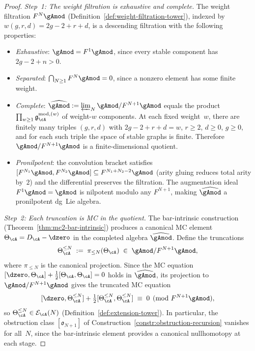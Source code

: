 \begin{proof}
\emph{Step~1: The weight filtration is exhaustive and complete.}
The weight filtration $F^N\gAmod$
(Definition~\ref{def:weight-filtration-tower}), indexed by
$w(g,r,d) = 2g-2+r+d$, is a descending filtration with the
following properties:
\begin{itemize}
\item \emph{Exhaustive}: $\gAmod = F^1\gAmod$, since every
  stable component has $2g - 2 + n > 0$.
\item \emph{Separated}: $\bigcap_{N \geq 1} F^N\gAmod = 0$,
  since a nonzero element has some finite weight.
\item \emph{Complete}: $\widehat{\gAmod}
  := \varprojlim_N \gAmod / F^{N+1}\gAmod$
  equals the product $\prod_{w \geq 1} \mathfrak{g}_{\cA}^{\mathrm{mod},(w)}$ of
  weight-$w$ components.  At each fixed weight~$w$, there are
  finitely many triples $(g,r,d)$ with $2g-2+r+d = w$, $r \geq 2$,
  $d \geq 0$, $g \geq 0$, and for each such triple the space of
  stable graphs is finite.  Therefore
  $\gAmod / F^{N+1}\gAmod$ is a finite-dimensional quotient.
\item \emph{Pronilpotent}: the convolution bracket satisfies
  $[F^{N_1}\gAmod, F^{N_2}\gAmod]
  \subseteq F^{N_1+N_2-2}\gAmod$
  (arity gluing reduces total arity by~$2$) and the differential
  preserves the filtration.  The augmentation ideal
  $F^1\gAmod = \gAmod$ is nilpotent modulo any
  $F^{N+1}$, making $\widehat{\gAmod}$ a pronilpotent
  dg~Lie algebra.
\end{itemize}

\smallskip\noindent
\emph{Step~2: Each truncation is MC in the quotient.}
The bar-intrinsic construction
(Theorem~\ref{thm:mc2-bar-intrinsic}) produces a canonical
MC element $\Theta_\cA = D_\cA - \dzero$ in the completed
algebra $\widehat{\gAmod}$.  Define the truncations
\[
\Theta_\cA^{\leq N}
\;:=\;
\pi_{\leq N}(\Theta_\cA)
\;\in\;
\gAmod / F^{N+1}\gAmod,
\]
where $\pi_{\leq N}$ is the canonical projection.  Since the
MC equation $[\dzero, \Theta_\cA]
+ \tfrac{1}{2}[\Theta_\cA, \Theta_\cA] = 0$ holds in
$\widehat{\gAmod}$, its projection to
$\gAmod / F^{N+1}\gAmod$ gives the truncated MC equation
\[
[\dzero, \Theta_\cA^{\leq N}]
+ \tfrac{1}{2}[\Theta_\cA^{\leq N},
\Theta_\cA^{\leq N}]
\;\equiv\; 0
\pmod{F^{N+1}\gAmod},
\]
so $\Theta_\cA^{\leq N} \in
\mathcal{E}_\cA(N)$
(Definition~\ref{def:extension-tower}).  In particular, the
obstruction class $[\mathfrak{o}_{N+1}]$ of
Construction~\ref{constr:obstruction-recursion} vanishes for
all~$N$, since the bar-intrinsic element provides a
canonical nullhomotopy at each stage.


\end{proof}
